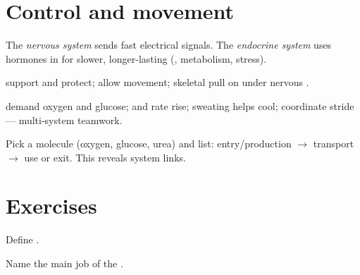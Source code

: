 \section{Control and movement}

\begin{definition}\label{def:g9:physiology:control}
The \emph{nervous system} sends fast electrical
signals. The \emph{endocrine system} uses hormones
in  for slower, longer-lasting  (, metabolism, stress).
\end{definition}

\begin{definition}[Musculoskeletal]\label{def:g9:physiology:msk}
 support and protect;  allow movement; skeletal  pull on
 under nervous .
\end{definition}

\begin{example}[Running]\label{ex:g9:physiology:run}
 demand oxygen and glucose;  and  rate rise;
sweating helps cool;  coordinate stride --- multi-system teamwork.
\end{example}

\begin{method}\label{met:g9:physiology:trace}
Pick a molecule (oxygen, glucose, urea) and list: entry/production 
$\to$ transport $\to$ use or exit. This reveals system links.
\end{method}

\section{Exercises}

\begin{exercise}[$\star$]\label{exo:g9:physiology:1}
Define .
\end{exercise}

\begin{exercise}[$\star$]\label{exo:g9:physiology:2}
Name the main job of the .
\end{exercise}

